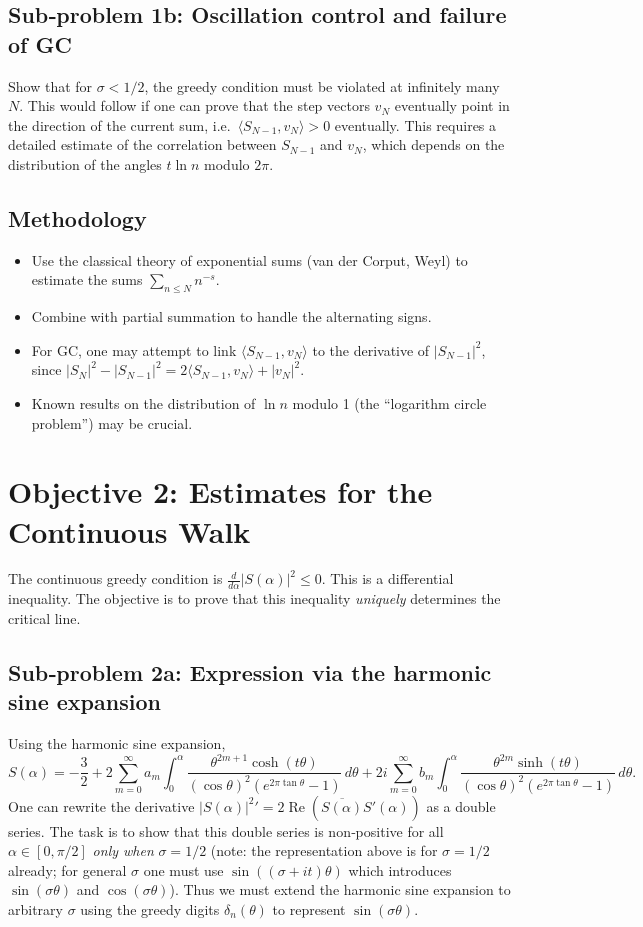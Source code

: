 \documentclass[11pt,a4paper]{article}
\begin{document}
\subsection{Sub‑problem 1b: Oscillation control and failure of GC}
Show that for $\sigma<1/2$, the greedy condition must be violated at infinitely many $N$.  This would follow if one can prove that the step vectors $v_N$ eventually point in the direction of the current sum, i.e.\ $\langle S_{N-1},v_N\rangle >0$ eventually.  This requires a detailed estimate of the correlation between $S_{N-1}$ and $v_N$, which depends on the distribution of the angles $t\ln n$ modulo $2\pi$.

\subsection{Methodology}
\begin{itemize}
    \item Use the classical theory of exponential sums (van der Corput, Weyl) to estimate the sums $\sum_{n\le N} n^{-s}$.
    \item Combine with partial summation to handle the alternating signs.
    \item For GC, one may attempt to link $\langle S_{N-1},v_N\rangle$ to the derivative of $|S_{N-1}|^2$, since $|S_N|^2-|S_{N-1}|^2 = 2\langle S_{N-1},v_N\rangle+|v_N|^2$.
    \item Known results on the distribution of $\ln n$ modulo 1 (the “logarithm circle problem”) may be crucial.
\end{itemize}

\section{Objective 2: Estimates for the Continuous Walk}
\label{sec:continuous}

The continuous greedy condition is $\frac{d}{d\alpha}|S(\alpha)|^2 \le 0$.  This is a differential inequality.  The objective is to prove that this inequality \emph{uniquely} determines the critical line.

\subsection{Sub‑problem 2a: Expression via the harmonic sine expansion}
Using the harmonic sine expansion,
\[
S(\alpha) = -\frac32 + 2\sum_{m=0}^\infty a_m \int_0^\alpha \frac{\theta^{2m+1}\cosh(t\theta)}{(\cos\theta)^2(e^{2\pi\tan\theta}-1)}\,d\theta
+ 2i\sum_{m=0}^\infty b_m \int_0^\alpha \frac{\theta^{2m}\sinh(t\theta)}{(\cos\theta)^2(e^{2\pi\tan\theta}-1)}\,d\theta .
\]
One can rewrite the derivative $|S(\alpha)|^2' = 2\operatorname{Re}(\overline{S(\alpha)}S'(\alpha))$ as a double series.  The task is to show that this double series is non‑positive for all $\alpha\in[0,\pi/2]$ \emph{only when} $\sigma=1/2$ (note: the representation above is for $\sigma=1/2$ already; for general $\sigma$ one must use $\sin((\sigma+it)\theta)$ which introduces $\sin(\sigma\theta)$ and $\cos(\sigma\theta)$).  Thus we must extend the harmonic sine expansion to arbitrary $\sigma$ using the greedy digits $\delta_n(\theta)$ to represent $\sin(\sigma\theta)$.
\end{document}
